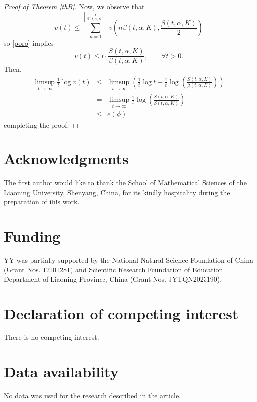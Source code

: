 \documentclass[11pt,letterpaper]{amsart}
\begin{document}
\begin{proof}[Proof of Theorem \ref{thB}]
Now, we observe that
$$
v(t)\leq \sum_{n=1}^{[\frac{t}{\beta(t,\alpha,K)}]}v(n\beta(t,\alpha,K), {\frac{\beta(t,\alpha,K)}2})
$$
so \eqref{poro} implies
$$
v(t)\leq t\cdot\frac{S(t,\alpha,K)}{\beta(t,\alpha,K)},\quad\quad\forall t>0.
$$
Then,
\begin{eqnarray*}
\limsup_{t\to\infty}\frac{1}t\log v(t)&\leq& \limsup_{t\to\infty}\left(\frac{1}t\log t+\frac{1}t\log \left(\frac{S(t,\alpha,K)}{\beta(t,\alpha,K)}\right)\right)\\
&=&
\limsup_{t\to\infty}\frac{1}t\log \left(\frac{S(t,\alpha,K)}{\beta(t,\alpha,K)}\right)\\
&\leq& e(\phi)
\end{eqnarray*}
completing the proof.
\end{proof}





\section*{Acknowledgments}

\noindent
The first author would like to thank the School of Mathematical Sciences of the
Liaoning University, Shenyang, China, for its kindly hospitality during the preparation of this work.




\section*{Funding}


\noindent
YY was partially supported by the National Natural Science Foundation of China (Grant Nos. 12101281) and Scientific Research Foundation of Education Department of Liaoning Province, China (Grant Nos. JYTQN2023190).






\section*{Declaration of competing interest}

\noindent
There is no competing interest.


\section*{Data availability}

\noindent
No data was used for the research described in the article.
\end{document}
